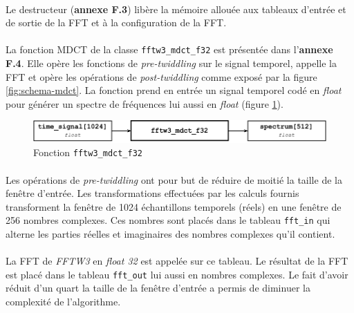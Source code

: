 \documentclass{article}
\begin{document}
    \paragraph{}
    Le destructeur (\textbf{annexe F.3}) libère la mémoire allouée aux tableaux d'entrée et de sortie de la FFT et à la configuration de la FFT.

    \paragraph{}
    La fonction MDCT de la classe \texttt{fftw3\_mdct\_f32} est présentée dans l'\textbf{annexe F.4}. Elle opère les fonctions de \emph{pre-twiddling} sur le signal temporel, appelle la FFT et opère les opérations de \emph{post-twiddling} comme exposé par la figure \ref{fig:schema-mdct}. La fonction prend en entrée un signal temporel codé en \emph{float} pour générer un spectre de fréquences lui aussi en \emph{float} (figure \ref{fig:func_fftw3_mdct_f32}).
    \begin{figure}[H]
        \centering
        \includegraphics[width=.8\linewidth]{./images/func_fftw3_mdct_f32.pdf}
        \caption{Fonction \texttt{fftw3\_mdct\_f32}}
        \label{fig:func_fftw3_mdct_f32}
    \end{figure}


    \paragraph{}
    Les opérations de \emph{pre-twiddling} ont pour but de réduire de moitié la taille de la fenêtre d'entrée. Les transformations effectuées par les calculs fournis transforment la fenêtre de 1024 échantillons temporels (réels) en une fenêtre de 256 nombres complexes. Ces nombres sont placés dans le tableau \texttt{fft\_in} qui alterne les parties réelles et imaginaires des nombres complexes qu'il contient.

    \paragraph{}
    La FFT de \emph{FFTW3} en \emph{float 32} est appelée sur ce tableau. Le résultat de la FFT est placé dans le tableau \texttt{fft\_out} lui aussi en nombres complexes. Le fait d'avoir réduit d'un quart la taille de la fenêtre d'entrée a permis de diminuer la complexité de l'algorithme.
\end{document}
